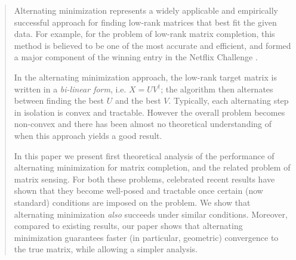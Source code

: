 \documentclass[11pt]{article}
\theoremstyle{plain}
\theoremstyle{definition}
\begin{document}
\maketitle
\begin{abstract}
Alternating minimization represents a widely applicable and empirically successful approach for finding low-rank matrices that best fit the given data. %
For example, for the problem of low-rank matrix completion, this method is believed to be one of the most accurate and efficient, and formed a major component of the winning entry in the Netflix Challenge \cite{Koren09,KorenBV09}. 

In the alternating minimization approach, the low-rank target matrix is written in a {\em bi-linear form}, i.e. $X = UV^\dag$; the algorithm then alternates between finding the best $U$ and the best $V$. Typically, each alternating step in isolation is convex and tractable. However the overall problem becomes non-convex and  there has been almost no theoretical understanding of when this approach yields a good result.

In this paper we present first theoretical analysis of  the performance of alternating minimization for matrix completion, and the related problem of matrix sensing. For both these problems, celebrated recent results have shown that they become well-posed and tractable once certain (now standard) conditions are imposed on the problem. We show that alternating minimization {\em also} succeeds under similar conditions. Moreover, compared to existing results, our paper shows that alternating minimization guarantees faster (in particular, geometric) convergence to the true matrix, while allowing a simpler analysis. %


\end{abstract}
\end{document}
